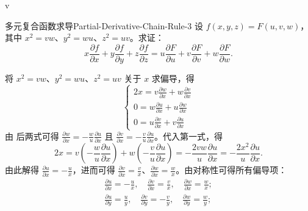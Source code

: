 v

\begin{problem}{多元复合函数求导}{Partial-Derivative-Chain-Rule-3}
    设 $f(x,y,z) = F(u,v,w)$，其中 $x^2 = vw$、$y^2 = wu$、$z^2 = uv$。求证：
    \begin{equation}
        x \frac{\partial f}{\partial x} + y \frac{\partial f}{\partial y} + z \frac{\partial f}{\partial z} = u \frac{\partial F}{\partial u} + v \frac{\partial F}{\partial v} + w \frac{\partial F}{\partial w}.
    \end{equation}
\end{problem}

\begin{myproof}
    将 $x^2 = vw$、$y^2 = wu$、$z^2 = uv$ 关于 $x$ 求偏导，得
    \begin{equation}
        \begin{cases}
            2x = v \frac{\partial w}{\partial x} + w \frac{\partial v}{\partial x} \\
            0 = w \frac{\partial u}{\partial x} + u \frac{\partial w}{\partial x}  \\
            0 = u \frac{\partial v}{\partial x} + v \frac{\partial u}{\partial x}
        \end{cases}
        \label{eq:differentiation-system}
    \end{equation}
    由  后两式可得 $\frac{\partial w}{\partial x} = -\frac{w}{u} \frac{\partial u}{\partial x}$ 且 $\frac{\partial v}{\partial x} = -\frac{v}{u} \frac{\partial u}{\partial x}$。代入第一式，得
    \begin{equation}
        2x = v \left( -\frac{w}{u} \frac{\partial u}{\partial x} \right) + w \left( -\frac{v}{u} \frac{\partial u}{\partial x} \right) = -\frac{2vw}{u} \frac{\partial u}{\partial x} = -\frac{2x^2}{u} \frac{\partial u}{\partial x}.
    \end{equation}
    由此解得 $\frac{\partial u}{\partial x} = -\frac{u}{x}$，进而可得 $\frac{\partial v}{\partial x} = \frac{v}{x}$、$\frac{\partial w}{\partial x} = \frac{w}{x}$。由对称性可得所有偏导项：
    \begin{equation}
        \begin{aligned}
            \frac{\partial u}{\partial x} = -\frac{u}{x}, \quad \frac{\partial v}{\partial x} = \frac{v}{x}, \quad \frac{\partial w}{\partial x} = \frac{w}{x}; \\
            \frac{\partial u}{\partial y} = \frac{u}{y}, \quad \frac{\partial v}{\partial y} = -\frac{v}{y}, \quad \frac{\partial w}{\partial y} = \frac{w}{y}; \\

\end{aligned}
\end{equation}
\end{myproof}
